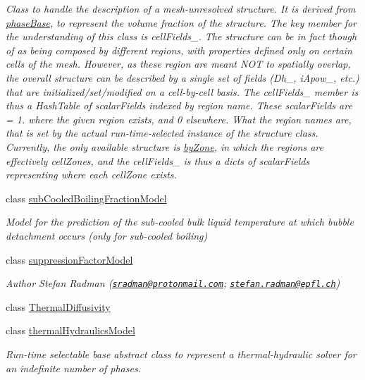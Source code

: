 \begin{DoxyCompactItemize}
\begin{DoxyCompactList}\small\item\em Class to handle the description of a mesh-\/unresolved structure. It is derived from \hyperlink{classFoam_1_1phaseBase}{phase\+Base}, to represent the volume fraction of the structure. The key member for the understanding of this class is cell\+Fields\+\_\+. The structure can be in fact though of as being composed by different regions, with properties defined only on certain cells of the mesh. However, as these region are meant N\+OT to spatially overlap, the overall structure can be described by a single set of fields (Dh\+\_\+, i\+Apow\+\_\+, etc.) that are initialized/set/modified on a cell-\/by-\/cell basis. The cell\+Fields\+\_\+ member is thus a Hash\+Table of scalar\+Fields indexed by region name. These scalar\+Fields are = 1. where the given region exists, and 0 elsewhere. What the region names are, that is set by the actual run-\/time-\/selected instance of the structure class. Currently, the only available structure is \hyperlink{classFoam_1_1byZone}{by\+Zone}, in which the regions are effectively cell\+Zones, and the cell\+Fields\+\_\+ is thus a dicts of scalar\+Fields representing where each cell\+Zone exists. \end{DoxyCompactList}\item 
class \hyperlink{classFoam_1_1subCooledBoilingFractionModel}{sub\+Cooled\+Boiling\+Fraction\+Model}
\begin{DoxyCompactList}\small\item\em Model for the prediction of the sub-\/cooled bulk liquid temperature at which bubble detachment occurs (only for sub-\/cooled boiling) \end{DoxyCompactList}\item 
class \hyperlink{classFoam_1_1suppressionFactorModel}{suppression\+Factor\+Model}
\begin{DoxyCompactList}\small\item\em Author Stefan Radman (\href{mailto:sradman@protonmail.com}{\tt sradman@protonmail.\+com}; \href{mailto:stefan.radman@epfl.ch}{\tt stefan.\+radman@epfl.\+ch}) \end{DoxyCompactList}\item 
class \hyperlink{classFoam_1_1ThermalDiffusivity}{Thermal\+Diffusivity}
\item 
class \hyperlink{classFoam_1_1thermalHydraulicsModel}{thermal\+Hydraulics\+Model}
\begin{DoxyCompactList}\small\item\em Run-\/time selectable base abstract class to represent a thermal-\/hydraulic solver for an indefinite number of phases. \end{DoxyCompactList}\item 

\end{DoxyCompactItemize}
